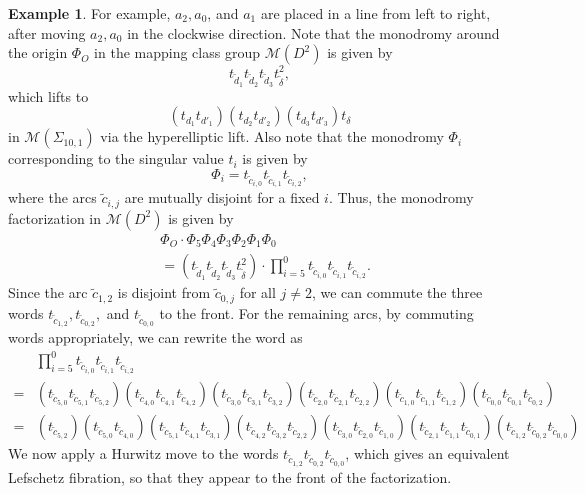 \documentclass[10pt,a4paper,reqno]{amsart}
\theoremstyle{definition}
\newtheorem{exam}[thm]{Example}
\numberwithin{equation}{section}
\numberwithin{figure}{section}
\begin{document}
\begin{exam}
For example, $a_2, a_0$, and $a_1$ are placed in a line from left to right, after moving $a_2, a_0$ in the clockwise direction.
Note that the monodromy around the origin $\Phi_O$ in the mapping class group $\mathcal{M}(D^2)$ is given by
\[t_{\tilde{d}_1} t_{\tilde{d}_2} t_{\tilde{d}_3} t_{\tilde{\delta}}^2,\]
which lifts to \[(t_{d_1}t_{d'_1})(t_{d_2}t_{d'_2})(t_{d_3}t_{d'_3})t_{\delta}\]
 in $\mathcal{M}(\Sigma_{10,1})$ via the hyperelliptic lift.
Also note that the monodromy $\Phi_i$ corresponding to the singular value $t_i$ is given by 
\[\Phi_i=t_{\tilde{c}_{i,0}}t_{\tilde{c}_{i,1}}t_{\tilde{c}_{i,2}},\]
where the arcs $\tilde{c}_{i,j}$ are mutually disjoint for a fixed $i$.
Thus, the monodromy factorization in $\mathcal{M}(D^2)$ is given by
\begin{align*}
&\Phi_O \cdot \Phi_5 \Phi_4\Phi_3\Phi_2\Phi_1\Phi_0 \\
&=\left(t_{\tilde{d}_1} t_{\tilde{d}_2} t_{\tilde{d}_3} t_{\tilde{\delta}}^2\right)\cdot  \prod_{i=5}^0 t_{\tilde{c}_{i,0}}t_{\tilde{c}_{i,1}}t_{\tilde{c}_{i,2}}.
\end{align*}
Since the arc $\tilde{c}_{1,2}$ is disjoint from $\tilde{c}_{0,j}$ for all $j\neq 2$,
we can commute the three words $t_{\tilde{c}_{1,2}}, t_{\tilde{c}_{0,2}},$ and $t_{\tilde{c}_{0,0}}$ to the front. 
For the remaining arcs, by commuting words appropriately, we can rewrite the word as
\begin{align*}
&\prod_{i=5}^0 t_{\tilde{c}_{i,0}}t_{\tilde{c}_{i,1}}t_{\tilde{c}_{i,2}} \\
=& (t_{\tilde{c}_{5,0}}t_{\tilde{c}_{5,1}}t_{\tilde{c}_{5,2}})(t_{\tilde{c}_{4,0}}t_{\tilde{c}_{4,1}}t_{\tilde{c}_{4,2}})  
(t_{\tilde{c}_{3,0}}t_{\tilde{c}_{3,1}}t_{\tilde{c}_{3,2}})(t_{\tilde{c}_{2,0}}t_{\tilde{c}_{2,1}}t_{\tilde{c}_{2,2}})
(t_{\tilde{c}_{1,0}}t_{\tilde{c}_{1,1}}t_{\tilde{c}_{1,2}})(t_{\tilde{c}_{0,0}}t_{\tilde{c}_{0,1}}t_{\tilde{c}_{0,2}})
\\
=& (t_{\tilde{c}_{5,2}}) (t_{\tilde{c}_{5,0}}t_{\tilde{c}_{4,0}}) ( t_{\tilde{c}_{5,1}}t_{\tilde{c}_{4,1}}t_{\tilde{c}_{3,1}})
( t_{\tilde{c}_{4,2}}t_{\tilde{c}_{3,2}}t_{\tilde{c}_{2,2}})( t_{\tilde{c}_{3,0}}t_{\tilde{c}_{2,0}}t_{\tilde{c}_{1,0}})
( t_{\tilde{c}_{2,1}}t_{\tilde{c}_{1,1}}t_{\tilde{c}_{0,1}}) ( t_{\tilde{c}_{1,2}}t_{\tilde{c}_{0,2}}t_{\tilde{c}_{0,0}})
\end{align*}
We now apply a Hurwitz move to the words $t_{\tilde{c}_{1,2}} t_{\tilde{c}_{0,2}}t_{\tilde{c}_{0,0}}$, which gives an equivalent Lefschetz fibration, so that they appear to the front of the factorization. 

\end{exam}
\end{document}
